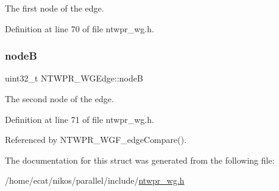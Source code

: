 The first node of the edge. 

Definition at line 70 of file ntwpr\+\_\+wg.\+h.

\mbox{\label{structNTWPR__WGEdge_a0f9b43039574824cc76908125ad3661d}} 
\subsubsection{\texorpdfstring{nodeB}{nodeB}}
{\footnotesize\ttfamily uint32\+\_\+t N\+T\+W\+P\+R\+\_\+\+W\+G\+Edge\+::nodeB}

The second node of the edge. 

Definition at line 71 of file ntwpr\+\_\+wg.\+h.



Referenced by N\+T\+W\+P\+R\+\_\+\+W\+G\+F\+\_\+edge\+Compare().



The documentation for this struct was generated from the following file\+:\begin{DoxyCompactItemize}
\item 
/home/ecat/nikos/parallel/include/\mbox{\hyperlink{ntwpr__wg_8h}{ntwpr\+\_\+wg.\+h}}\end{DoxyCompactItemize}

